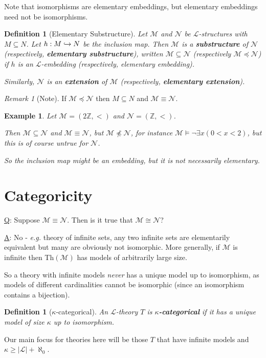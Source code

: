 \documentclass[]{article}
\theoremstyle{custhm}
\theoremstyle{cusdef}
\newtheorem{defin}[theorem]{Definition}
\theoremstyle{custhm}
\theoremstyle{custhm}
\theoremstyle{custhm}
\theoremstyle{ex}
\newtheorem{ex}[theorem]{Example}
\theoremstyle{custhm}
\theoremstyle{cusdef}
\theoremstyle{remark}
\newtheorem*{remark*}{Remark}
\theoremstyle{remark}
\theoremstyle{numremark}
\newcommand{\Z}{\mathbb{Z}}
\newcommand{\undf}[1]{\textit{\textbf{#1}}}
\renewcommand{\L}{\mathcal{L}}
\renewcommand{\it}[1]{\textit{#1}}
\newcommand{\M}{\mathcal{M}}
\newcommand{\N}{\mathcal{N}}
\renewcommand{\subset}{\subseteq}
\begin{document}
Note that isomorphisms are elementary embeddings, but elementary embeddings need not be isomorphisms.

\begin{defin}[Elementary Substructure]
Let $\M$ and $\N$ be $\L$-structures with $M\subset N$. Let $h:M \xhookrightarrow{} N$ be the inclusion map. Then $\M$ is a \undf{substructure} of $\N$ (respectively, \undf{elementary substructure}), written $\M\subset \N$ (respectively $\M\preceq\N$) if $h$ is an $\L$-embedding (respectively, elementary embedding).

Similarly, $\N$ is an \undf{extension} of $\M$ (respectively, \undf{elementary extension}).
\end{defin}	

\begin{remark*}[Note]
If $\M\preceq\N$ then $M\subset N$ and $\M\equiv \N$.
\end{remark*}
\begin{ex}
Let $\M = (2\Z, <)$ and $\N = (\Z, <)$.

Then $\M \subset \N$ and $\M \equiv \N$, but $\M\not\preceq\N$, for instance $\M\models \neg\exists x(0 < x < 2)$, but this is of course untrue for $\N$.

So the inclusion map might be an embedding, but it is not necessarily elementary.
\end{ex}


\section{Categoricity}

\underline{Q}: Suppose $\M\equiv\N$. Then is it true that $\M \cong \N$?

\underline{A}: No - \it{e.g.} theory of infinite sets, any two infinite sets are elementarily equivalent but many are obviously not isomorphic. More generally, if $\M$ is infinite then Th$(\M)$ has models of arbitrarily large size.

So a theory with infinite models \it{never} has a unique model up to isomorphism, as models of different cardinalities cannot be isomorphic (since an isomorphism contains a bijection).

\begin{defin}[$\kappa$-categorical]
An $\L$-theory $T$ is \undf{$\kappa$-categorical} if it has a unique model of size $\kappa$ up to isomorphism.
\end{defin}
Our main focus for theories here will be those $T$ that have infinite models and $\kappa \ge |\L| + \aleph_0$.
\end{document}

